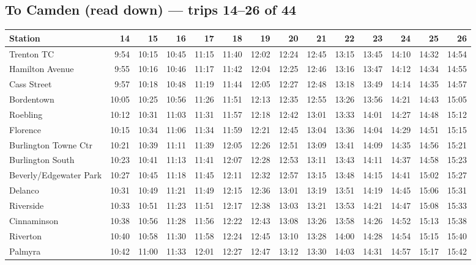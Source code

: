 \subsection*{To Camden (read down) --- trips 14--26 of 44}
\begin{center}\footnotesize\setlength{\tabcolsep}{3pt}\begin{tabular}{@{}lrrrrrrrrrrrrr@{}}\toprule
Station & 14 & 15 & 16 & 17 & 18 & 19 & 20 & 21 & 22 & 23 & 24 & 25 & 26 \\\midrule
Trenton TC & 9:54 & 10:15 & 10:45 & 11:15 & 11:40 & 12:02 & 12:24 & 12:45 & 13:15 & 13:45 & 14:10 & 14:32 & 14:54 \\
Hamilton Avenue & 9:55 & 10:16 & 10:46 & 11:17 & 11:42 & 12:04 & 12:25 & 12:46 & 13:16 & 13:47 & 14:12 & 14:34 & 14:55 \\
Cass Street & 9:57 & 10:18 & 10:48 & 11:19 & 11:44 & 12:05 & 12:27 & 12:48 & 13:18 & 13:49 & 14:14 & 14:35 & 14:57 \\
Bordentown & 10:05 & 10:25 & 10:56 & 11:26 & 11:51 & 12:13 & 12:35 & 12:55 & 13:26 & 13:56 & 14:21 & 14:43 & 15:05 \\
Roebling & 10:12 & 10:31 & 11:03 & 11:31 & 11:57 & 12:18 & 12:42 & 13:01 & 13:33 & 14:01 & 14:27 & 14:48 & 15:12 \\
Florence & 10:15 & 10:34 & 11:06 & 11:34 & 11:59 & 12:21 & 12:45 & 13:04 & 13:36 & 14:04 & 14:29 & 14:51 & 15:15 \\
Burlington Towne Ctr & 10:21 & 10:39 & 11:11 & 11:39 & 12:05 & 12:26 & 12:51 & 13:09 & 13:41 & 14:09 & 14:35 & 14:56 & 15:21 \\
Burlington South & 10:23 & 10:41 & 11:13 & 11:41 & 12:07 & 12:28 & 12:53 & 13:11 & 13:43 & 14:11 & 14:37 & 14:58 & 15:23 \\
Beverly/Edgewater Park & 10:27 & 10:45 & 11:18 & 11:45 & 12:11 & 12:32 & 12:57 & 13:15 & 13:48 & 14:15 & 14:41 & 15:02 & 15:27 \\
Delanco & 10:31 & 10:49 & 11:21 & 11:49 & 12:15 & 12:36 & 13:01 & 13:19 & 13:51 & 14:19 & 14:45 & 15:06 & 15:31 \\
Riverside & 10:33 & 10:51 & 11:23 & 11:51 & 12:17 & 12:38 & 13:03 & 13:21 & 13:53 & 14:21 & 14:47 & 15:08 & 15:33 \\
Cinnaminson & 10:38 & 10:56 & 11:28 & 11:56 & 12:22 & 12:43 & 13:08 & 13:26 & 13:58 & 14:26 & 14:52 & 15:13 & 15:38 \\
Riverton & 10:40 & 10:58 & 11:30 & 11:58 & 12:24 & 12:45 & 13:10 & 13:28 & 14:00 & 14:28 & 14:54 & 15:15 & 15:40 \\
Palmyra & 10:42 & 11:00 & 11:33 & 12:01 & 12:27 & 12:47 & 13:12 & 13:30 & 14:03 & 14:31 & 14:57 & 15:17 & 15:42 \\

\end{tabular}
\end{center}
